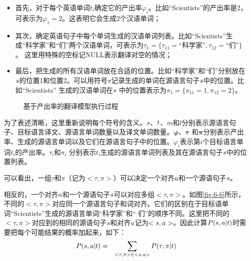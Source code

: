 \begin{itemize}
\vspace{0.3em}
\item 首先，对于每个英语单词$t_i$确定它的产出率$\varphi_{i}$。比如“Scientists”的产出率是2，可表示为${\varphi}_{1}=2$。这表明它会生成2个汉语单词；
\vspace{0.3em}
\item 其次，确定英语句子中每个单词生成的汉语单词列表。比如“Scientists”生成“科学家”和“们”两个汉语单词，可表示为${\tau}_1=\{{\tau}_{11}=\textrm{“科学家”},{\tau}_{12}=\textrm{“们”}\}$。 这里用特殊的空标记NULL表示翻译对空的情况；
\vspace{0.3em}
\item 最后，把生成的所有汉语单词放在合适的位置。比如“科学家”和“们”分别放在${s}$的位置1和位置2。可以用符号$\pi$记录生成的单词在源语言句子${s}$中的位置。比如“Scientists” 生成的汉语单词在${s}$ 中的位置表示为${\pi}_{1}=\{{\pi}_{11}=1,{\pi}_{12}=2\}$。
\vspace{0.3em}
\end{itemize}

\begin{figure}[htp]
    \centering

   \caption{基于产出率的翻译模型执行过程}
   \label{fig:6-5}
\end{figure}

\parinterval 为了表述清晰，这里重新说明每个符号的含义。${s}$、${t}$、$m$和$l$分别表示源语言句子、目标语言译文、源语言单词数量以及译文单词数量。$\mathbf{\varphi}$、$\mathbf{\tau}$ 和$\mathbf{\pi}$分别表示产出率、生成的源语言单词以及它们在源语言句子中的位置。${\varphi}_{i}$表示第$i$个目标语言单词$t_i$的产出率。${\tau}_{i}$和${\pi}_i$ 分别表示$t_i$生成的源语言单词列表及其在源语言句子${s}$中的位置列表。

\parinterval 可以看出，一组$\tau$和$\pi$（记为$<\tau,\pi>$）可以决定一个对齐${a}$和一个源语句子${s}$。

\noindent 相反的，一个对齐${a}$和一个源语句子${s}$可以对应多组$<\tau,\pi>$。如图\ref{fig:6-6}所示，不同的$<\tau,\pi>$对应同一个源语言句子和词对齐。它们的区别在于目标语单词“Scientists”生成的源语言单词“科学家”和“ 们”的顺序不同。这里把不同的$<\tau,\pi>$对应到的相同的源语句子${s}$和对齐${a}$记为$<{s},{a}>$。因此计算${P}({s},{a}| {t})$时需要把每个可能结果的概率加起来，如下：
\begin{eqnarray}
{P}({s},{a}| {t}) & = & \sum_{{<\tau,\pi>}\in{<{s},{a}>}}{{P}(\tau,\pi|{t}) }
\label{eq:6-9}
\end{eqnarray}

